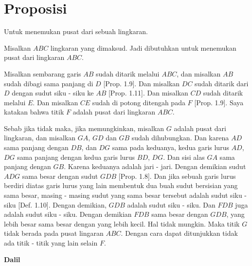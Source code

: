 \documentclass[a4paper]{book}
\begin{document}
\section*{\centering Proposisi \thesection}
Untuk menemukan pusat dari sebuah lingkaran.
\begin{center}
\end{center}
Misalkan $ABC$ lingkaran yang dimaksud. Jadi dibutuhkan untuk menemukan pusat
dari lingkaran $ABC$.

Misalkan sembarang garis $AB$ sudah ditarik melalui $ABC$, dan misalkan $AB$
sudah dibagi sama panjang di $D$ [Prop. 1.9]. Dan misalkan $DC$ sudah
ditarik dari $D$ dengan sudut siku - siku ke $AB$ [Prop. 1.11]. Dan misalkan
$CD$ sudah ditarik melalui $E$. Dan misalkan $CE$ sudah di potong ditengah pada
$F$ [Prop. 1.9]. Saya katakan bahwa titik $F$ adalah pusat dari lingkaran $ABC$.

Sebab jika tidak maka, jika memungkinkan, misalkan $G$ adalah pusat dari 
lingkaran, dan misalkan $GA$, $GD$ dan $GB$ sudah dihubungkan. Dan karena $AD$
sama panjang dengan $DB$, dan $DG$ sama pada keduanya, kedua garis lurus
$AD$, $DG$ sama panjang dengan kedua garis lurus $BD$, $DG$. Dan sisi alas $GA$
sama panjang dengan $GB$. Karena keduanya adalah jari - jari. 
Dengan demikian sudut $ADG$ sama besar dengan sudut $GDB$
[Prop. 1.8]. Dan jika sebuah garis lurus berdiri diatas garis lurus yang lain
membentuk dua buah sudut bersisian yang sama besar, masing - masing sudut yang
sama besar tersebut adalah sudut siku - siku [Def. 1.10]. Dengan demikian, 
$GDB$ adalah sudut siku - siku. Dan $FDB$ juga adalah sudut siku - siku. Dengan
demikian $FDB$ sama besar dengan $GDB$, yang lebih besar sama besar dengan yang
lebih kecil. Hal tidak mungkin. Maka titik $G$ tidak berada pada pusat 
lingaran $ABC$. Dengan cara dapat ditunjukkan tidak ada  titik - titik yang 
lain selain $F$.


\begin{center}\textbf{Dalil}\end{center}
\end{document}
